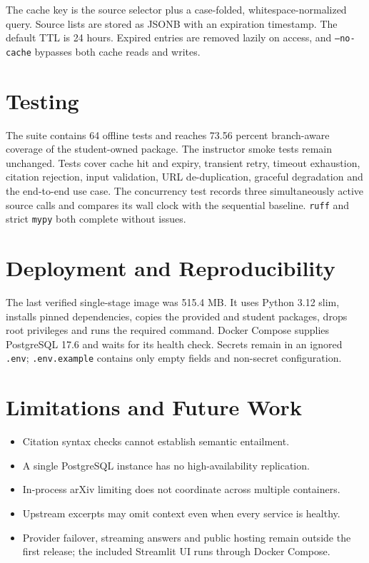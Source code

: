 \documentclass[11pt,a4paper]{article}
\begin{document}
The cache key is the source selector plus a case-folded, whitespace-normalized query. Source lists
are stored as JSONB with an expiration timestamp. The default TTL is 24 hours. Expired entries are
removed lazily on access, and \texttt{--no-cache} bypasses both cache reads and writes.

\section{Testing}
The suite contains 64 offline tests and reaches 73.56 percent branch-aware coverage of the
student-owned package. The instructor smoke tests remain unchanged. Tests cover cache hit and
expiry, transient retry, timeout exhaustion, citation rejection, input validation, URL
de-duplication, graceful degradation and the end-to-end use case. The concurrency test records three
simultaneously active source calls and compares its wall clock with the sequential baseline.
\texttt{ruff} and strict \texttt{mypy} both complete without issues.

\section{Deployment and Reproducibility}
The last verified single-stage image was 515.4 MB. It uses Python 3.12 slim, installs pinned dependencies, copies the
provided and student packages, drops root privileges and runs the required command. Docker Compose
supplies PostgreSQL 17.6 and waits for its health check. Secrets remain in an ignored
\texttt{.env}; \texttt{.env.example} contains only empty fields and non-secret configuration.

\section{Limitations and Future Work}
\begin{itemize}
  \item Citation syntax checks cannot establish semantic entailment.
  \item A single PostgreSQL instance has no high-availability replication.
  \item In-process arXiv limiting does not coordinate across multiple containers.
  \item Upstream excerpts may omit context even when every service is healthy.
  \item Provider failover, streaming answers and public hosting remain outside the first release;
        the included Streamlit UI runs through Docker Compose.
\end{itemize}
\end{document}
